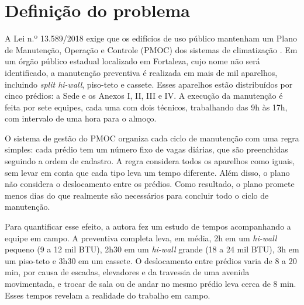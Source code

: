 \section{Definição do problema}

A Lei n.º 13.589/2018 exige que os edifícios de uso público mantenham um Plano de Manutenção, Operação e Controle (PMOC) dos sistemas de climatização \cite{brasil2018lei}. Em um órgão público estadual localizado em Fortaleza, cujo nome não será identificado, a manutenção preventiva é realizada em mais de mil aparelhos, incluindo \textit{split hi-wall}, piso-teto e cassete. Esses aparelhos estão distribuídos por cinco prédios: a Sede e os Anexos I, II, III e IV. A execução da manutenção é feita por sete equipes, cada uma com dois técnicos, trabalhando das 9h às 17h, com intervalo de uma hora para o almoço.

O sistema de gestão do PMOC organiza cada ciclo de manutenção com uma regra simples: cada prédio tem um número fixo de vagas diárias, que são preenchidas seguindo a ordem de cadastro. A regra considera todos os aparelhos como iguais, sem levar em conta que cada tipo leva um tempo diferente. Além disso, o plano não considera o deslocamento entre os prédios. Como resultado, o plano promete menos dias do que realmente são necessários para concluir todo o ciclo de manutenção.

Para quantificar esse efeito, a autora fez um estudo de tempos acompanhando a equipe em campo. A preventiva completa leva, em média, 2h em um \textit{hi-wall} pequeno (9 a 12 mil BTU), 2h30 em um \textit{hi-wall} grande (18 a 24 mil BTU), 3h em um piso-teto e 3h30 em um cassete. O deslocamento entre prédios varia de 8 a 20 min, por causa de escadas, elevadores e da travessia de uma avenida movimentada, e trocar de sala ou de andar no mesmo prédio leva cerca de 8 min. Esses tempos revelam a realidade do trabalho em campo.

